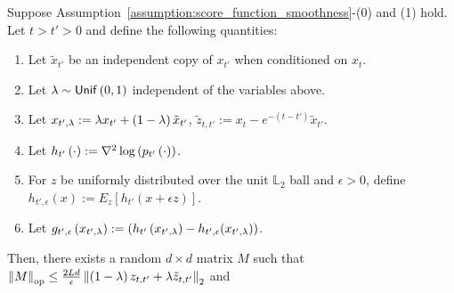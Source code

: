 \begin{lemma}\label{lemma:hessian_smoothness_decomp}
Suppose Assumption~\ref{assumption:score_function_smoothness}-(0) and (1) hold. Let $t > t' > 0$ and define the following quantities:
\begin{enumerate}
    \item Let $\tilde{x}_{t'}$ be an independent copy of $x_{t'}$ when conditioned on $x_{t}$.
    \item Let $\lambda \sim \mathsf{Unif}\left(0,1\right)$ independent of the variables above.
    \item Let $x_{t',\lambda} := \lambda x_{t'} + \left(1-\lambda\right)\tilde{x}_{t'}$, $\tilde{z}_{t,t'} := x_t - e^{-(t-t')}\tilde{x}_{t'}$.
    \item Let $h_{t'}\left(\cdot\right) := \nabla^{2}\log\left(p_{t'}\left(\cdot\right)\right)$.
    \item  For $z$ be uniformly distributed over the unit $\mathbb{L}_{2}$ ball and $\epsilon > 0$, define $h_{t', \epsilon}(x) := E_{z}[h_{t'}(x + \epsilon z)]$.
    \item  Let $g_{t', \epsilon}\left(x_{t',\lambda}\right) := \left(h_{t'}\left(x_{t',\lambda}\right) - h_{t', \epsilon}(x_{t',\lambda})\right)$.
\end{enumerate}
 Then, there exists a random $d\times d$ matrix $M$ such that $\left\lVert M\right\rVert_{\textup{op}} \leq \frac{2Ld}{\epsilon}\left\lVert\left(1-\lambda\right)z_{t,t'} + \lambda\tilde{z}_{t,t'}\right\rVert_{2}$ and

\end{lemma}
